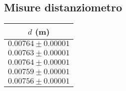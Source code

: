 \subsection{Misure distanziometro}
\begin{table}[H]
\centering
\begin{tabular}{|c|}
\hline
\( d \) (m) \\
\hline
\( 0.00764 \pm 0.00001 \) \\
\hline
\( 0.00763 \pm 0.00001 \) \\
\hline
\( 0.00764 \pm 0.00001 \) \\
\hline
\( 0.00759 \pm 0.00001 \) \\
\hline
\( 0.00756 \pm 0.00001 \) \\
\hline
\end{tabular}
\end{table}
